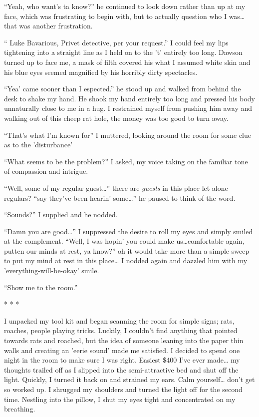 ``Yeah, who want's ta know?'' he continued to look down
rather than up at my face, which was frustrating to begin with, but
to actually question who I was{\ldots} that was another
frustration.

`` Luke Bavarious, Privet detective, per your request.''
I could feel my lips tightening into a straight line as I held on
to the 't' entirely too long. Dawson turned up to face me, a mask
of filth covered his what I assumed white skin and his blue eyes
seemed magnified by his horribly dirty spectacles.

``Yea' came sooner than I espected.'' he stood up and
walked from behind the desk to shake my hand. He shook my hand
entirely too long and pressed his body unnaturally close to me in a
hug. I restrained myself from pushing him away and walking out of
this cheep rat hole, the money was too good to turn away.

``That's what I'm known for'' I muttered, looking around
the room for some clue as to the 'disturbance'

``What seems to be the problem?'' I asked, my voice
taking on the familiar tone of compassion and intrigue.

``Well, some of my regular guest{\ldots}'' there are {\em guests} in
this place let alone regulars? ``say they've been hearin' some{\ldots}''
he paused to think of the word.

``Sounds?'' I supplied and he nodded.

``Damn you are good{\ldots}'' I suppressed the desire to roll
my eyes and simply smiled at the complement. ``Well, I was
hopin' you could make us{\ldots}comfortable again, putten our minds at
rest, ya know?'' oh it would take more than a simple sweep to
put my mind at rest in this place{\ldots} I nodded again and dazzled him
with my 'everything-will-be-okay' smile.

``Show me to the room.''

* * *

I unpacked my tool kit and began scanning the room for simple
signs; rats, roaches, people playing tricks. Luckily, I couldn't
find anything that pointed towards rats and roached, but the idea
of someone leaning into the paper thin walls and creating an 'eerie
sound' made me satisfied. I decided to spend one night in the room
to make sure I was right. Easiest \$400 I've ever made{\ldots} my
thoughts trailed off as I slipped into the semi-attractive bed and
shut off the light. Quickly, I turned it back on and strained my
ears. Calm yourself{\ldots} don't get so worked up. I shrugged my
shoulders and turned the light off for the second time. Nestling
into the pillow, I shut my eyes tight and concentrated on my
breathing.

